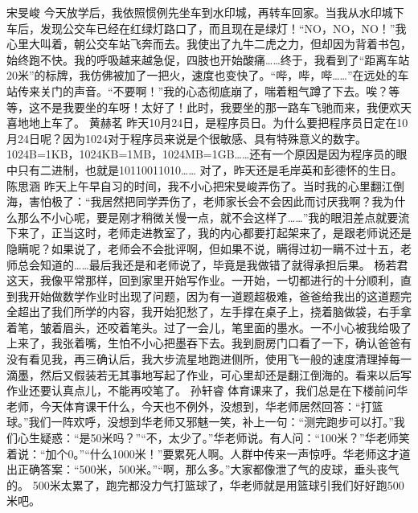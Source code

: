 {}\markdownRendererInterblockSeparator
{}宋旻峻\markdownRendererInterblockSeparator
{}今天放学后，我依照惯例先坐车到水印城，再转车回家。当我从水印城下车后，发现公交车已经在红绿灯路口了，而且现在是绿灯！“NO，NO，NO！”我心里大叫着，朝公交车站飞奔而去。我使出了九牛二虎之力，但却因为背着书包，始终跑不快。我的呼吸越来越急促，四肢也开始酸痛……终于，我看到了“距离车站20米”的标牌，我仿佛被加了一把火，速度也变快了。“哔，哔，哔……”在远处的车站传来关门的声音。“不要啊！”我的心态彻底崩了，喘着粗气蹲了下去。唉？等等，这不是我要坐的车呀！太好了！此时，我要坐的那一路车飞驰而来，我便欢天喜地地上车了。\markdownRendererInterblockSeparator
{}\markdownRendererInterblockSeparator
{}黄赫茗\markdownRendererInterblockSeparator
{}昨天10月24日，是程序员日。为什么要把程序员日定在10月24日呢？因为1024对于程序员来说是个很敏感、具有特殊意义的数字。1024B=1KB，1024KB=1MB，1024MB=1GB……还有一个原因是因为程序员的眼中只有二进制，也就是10110011010……\markdownRendererInterblockSeparator
{}对了，昨天还是毛岸英和彭德怀的生日。\markdownRendererInterblockSeparator
{}\markdownRendererInterblockSeparator
{}陈思涵\markdownRendererInterblockSeparator
{}昨天上午早自习的时间，我不小心把宋旻峻弄伤了。当时我的心里翻江倒海，害怕极了：“我居然把同学弄伤了，老师家长会不会因此而讨厌我啊？我为什么那么不小心呢，要是刚才稍微关慢一点，就不会这样了……”我的眼泪差点就要流下来了，正当这时，老师走进教室了，我的内心都要打起架来了，是跟老师说还是隐瞒呢？如果说了，老师会不会批评啊，但如果不说，瞒得过初一瞒不过十五，老师总会知道的……最后我还是和老师说了，毕竟是我做错了就得承担后果。\markdownRendererInterblockSeparator
{}\markdownRendererInterblockSeparator
{}杨若君\markdownRendererInterblockSeparator
{}这天，我像平常那样，回到家里开始写作业。一开始，一切都进行的十分顺利，直到我开始做数学作业时出现了问题，因为有一道题超极难，爸爸给我出的这道题完全超出了我们所学的内容，我开始犯愁了，左手撑在桌子上，挠着脑做袋，右手拿着笔，皱着眉头，还咬着笔头。过了一会儿，笔里面的墨水。一不小心被我给吸了上来了，我张着嘴，生怕不小心把墨吞下去。我到厨房门口看了一下，确认爸爸有没有看见我，再三确认后，我大步流星地跑进侧所，使用飞一般的速度清理掉每一滴墨，然后又假装若无其事地写起了作业，可心里却还是翻江倒海的。看来以后写作业还要认真点儿，不能再咬笔了。 \markdownRendererInterblockSeparator
{}\markdownRendererInterblockSeparator
{}孙轩睿\markdownRendererInterblockSeparator
{}体育课来了，我们总是在下楼前问华老师，今天体育课干什么，今天也不例外，没想到，华老师居然回答：“打篮球。”我们一阵欢呼，没想到华老师又邪魅一笑，补上一句：“测完跑步可以打。”我们心生疑惑：“是50米吗？”“不，太少了。”华老师说。有人问：“100米？”华老师笑着说：“加个0。”“什么1000米！”要累死人啊。人群中传来一声惊呼。华老师这才道出正确答案：“500米，500米。”“啊，那么多。”大家都像泄了气的皮球，垂头丧气的。 500米太累了，跑完都没力气打篮球了，华老师就是用篮球引我们好好跑500米吧。\markdownRendererInterblockSeparator
